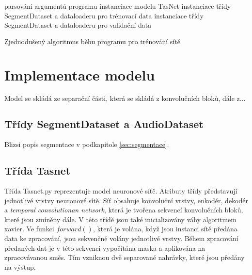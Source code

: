 \begin{algorithm}[H]
 \LinesNumbered
 parsování argumentů programu\;
 instanciace modelu TasNet\;
 instanciace třídy SegmentDataset a dataloaderu pro trénovací data\;
 instanciace třídy SegmentDataset a dataloaderu pro validační data\;
 \caption{\label{alg:zakladnibeh}Zjednodušený algoritmus běhu programu pro trénování sítě}
\end{algorithm}


\section{Implementace modelu}
Model se skládá ze separační části, která se skládá z konvolučních bloků, dále z...




\subsection*{Třídy SegmentDataset a AudioDataset}
Blizsi popis segmentace v podkapitole \ref{sec:segmentace}.


\subsection*{Třída Tasnet}
Třída Tasnet.py reprezentuje model neuronové sítě. Atributy třídy představují jednotlivé vrstvy neuronové sítě. Síť obsahuje konvoluční vrstvy, enkodér, dekodér a \textit{temporal convolutionan network}, která je tvořena sekvencí konvolučních bloků, které jsou zmíněny dále. V této třídě jsou také inicializovány váhy algoritmem xavier. Ve funkci $forward()$, která je volána, když jsou instanci sítě předána data ke zpracování, jsou sekvenčně volány jednotlivé vrstvy. Během zpracování předaných dat je v této sekvenci vypočítána maska a aplikována na zpracovávanou směs. Tím vzniknou dvě separované nahrávky, které jsou předány na výstup. 

